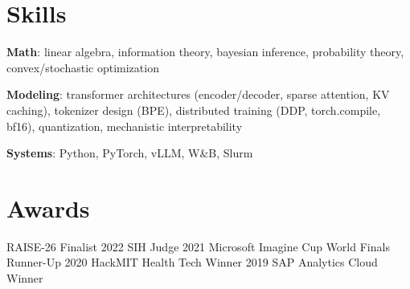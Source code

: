 \documentclass{ExpressiveResume}
\begin{document}

\section{Skills}
\noindent\textbf{Math}: linear algebra, information theory, bayesian inference, probability theory, convex/stochastic optimization

\vspace{\spacesmall}
\noindent\textbf{Modeling}: transformer architectures (encoder/decoder, sparse attention, KV caching), tokenizer design (BPE), distributed training (DDP, torch.compile, bf16), quantization, mechanistic interpretability

\vspace{\spacesmall}
\noindent\textbf{Systems}: Python, PyTorch, vLLM, W\&B, Slurm

\section{Awards}

\noindent RAISE-26 Finalist \textbar{} 2022 SIH Judge \textbar{} 2021 Microsoft Imagine Cup World Finals Runner-Up \textbar{} 2020 HackMIT Health Tech Winner \textbar{} 2019 SAP Analytics Cloud Winner
\end{document}
